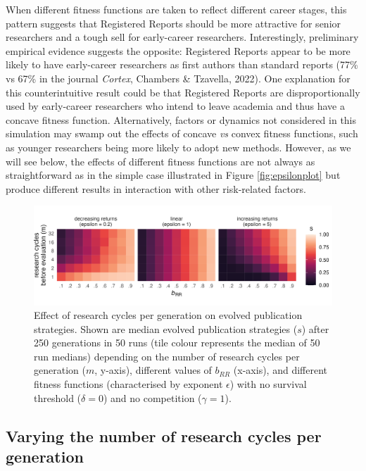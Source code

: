 \documentclass[
  ,man,mask,floatsintext]{apa6}
\begin{document}
When different fitness functions are taken to reflect different career stages,
this pattern suggests that Registered Reports should be more attractive for senior researchers and a tough sell for early-career researchers.
Interestingly, preliminary empirical evidence suggests the opposite:
Registered Reports appear to be more likely to have early-career researchers as first authors than standard reports (77\% vs 67\% in the journal \emph{Cortex}, Chambers \& Tzavella, 2022).
One explanation for this counterintuitive result could be that Registered Reports are disproportionally used by early-career researchers who intend to leave academia and thus have a concave fitness function.
Alternatively, factors or dynamics not considered in this simulation may swamp out the effects of concave \emph{vs} convex fitness functions, such as younger researchers being more likely to adopt new methods.
However, as we will see below, the effects of different fitness functions are not always as straightforward as in the simple case illustrated in Figure \ref{fig:epsilonplot} but produce different results in interaction with other risk-related factors.



\begin{figure}

{\centering \includegraphics[width=1\linewidth]{plots/plot_m_evo_rocket} 

}

\caption{Effect of research cycles per generation on evolved publication strategies. Shown are median evolved publication strategies (\(s\)) after 250 generations in 50 runs (tile colour represents the median of 50 run medians) depending on the number of research cycles per generation (\(m\), y-axis), different values of \(b_{RR}\) (x-axis), and different fitness functions (characterised by exponent \(\epsilon\)) with no survival threshold (\(\delta = 0\)) and no competition (\(\gamma = 1\)).}\label{fig:mplot}
\end{figure}

\hypertarget{varying-the-number-of-research-cycles-per-generation}{%
\subsection{Varying the number of research cycles per generation}\label{varying-the-number-of-research-cycles-per-generation}}
\end{document}
